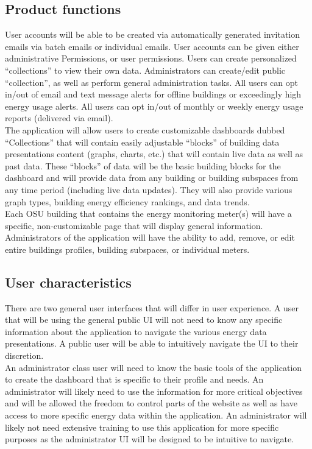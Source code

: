 \documentclass[onecolumn, draftclsnofoot,10pt, compsoc]{IEEEtran}
\begin{document}
    \subsection{Product functions}
    User accounts will be able to be created via automatically generated	invitation emails via batch emails or individual emails. User accounts can be given either administrative Permissions, or user permissions. Users can create personalized ``collections'' to view their own data. Administrators can create/edit public ``collection'', as well as perform general administration tasks. All users	can opt in/out of email and text message alerts for offline buildings or exceedingly high energy usage alerts. All users can opt in/out of monthly or weekly energy usage reports (delivered via email).\\ 
    The application will allow users to create customizable dashboards dubbed “Collections” that will contain easily adjustable “blocks” of building data presentations content	(graphs, charts, etc.) that will contain live data as well as past data. These “blocks” of data will be the basic building blocks for the dashboard and will provide data from any building or building subspaces from any time period (including live data updates). They will also provide various graph types, building energy efficiency rankings, and data trends.\\
    Each OSU building that contains the energy monitoring meter(s) will have a specific, non-customizable page that will display general information.\\
    Administrators of the application will have the ability to add, remove, or edit entire buildings profiles, building subspaces, or individual meters.
    \subsection{User characteristics}
    There are two general user interfaces that will differ in user experience. A user that will be using the general public UI will not need to know any specific information about the application to navigate the various energy data presentations. A public user will be able to intuitively navigate the UI to their discretion.\\ 
    An administrator class user will need to know the basic tools of the application to create the dashboard that is specific to their profile and needs. An administrator will likely need to use the information for more critical objectives and will be allowed the freedom to control parts of the website as well as have access to more specific energy data within the application. An administrator will likely not need extensive training to use this application for more specific purposes as the administrator UI will be designed to be intuitive to navigate.
\end{document}
